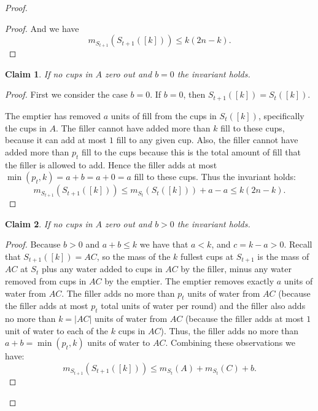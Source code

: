\documentclass[twocolumn]{article}[10pt]
\newtheorem{clm}{Claim}
\begin{document}
\begin{proof}
\begin{proof}
  And we have
  $$m_{S_{t+1}}(S_{t+1}([k])) \le k(2n-k).$$
\end{proof}

\begin{clm}
  If no cups in $A$ zero out and $b=0$ the invariant holds.
\end{clm}
\begin{proof}
First we consider the case $b=0$. If $b=0$, then $S_{t+1}([k]) = S_t([k])$. 

The emptier has removed $a$ units of fill from the cups in $S_t([k])$,
specifically the cups in $A$. The filler cannot have added more than $k$ fill
to these cups, because it can add at most $1$ fill to any given cup. Also, the
filler cannot have added more than $p_t$ fill to the cups because this is the
total amount of fill that the filler is allowed to add. Hence the filler adds
at most $\min(p_t, k) = a+b=a+0=a$ fill to these cups.
Thus the invariant holds:
$$m_{S_{t+1}}(S_{t+1}([k])) \le m_{S_t}(S_t([k]))+a-a \le k(2n-k).$$

\end{proof}

\begin{clm}
  If no cups in $A$ zero out and $b > 0$ the invariant holds.
\end{clm}
\begin{proof}
Because $b>0$ and $a+b \le k$ we have that $a
< k$, and $c = k-a > 0$. Recall that $S_{t+1}([k]) = AC$, so the mass of the
$k$ fullest cups at $S_{t+1}$ is the mass of $AC$ at $S_t$ plus any water added
to cups in $AC$ by the filler, minus any water removed from cups in $AC$ by the
emptier. The emptier removes exactly $a$ units of water from $AC$.
The filler adds no more than $p_t$ units of water from $AC$ (because the filler
adds at most $p_t$ total units of water per round) and the filler also
adds no more than $k = |AC|$ units of water from $AC$ (because the filler adds
at most $1$ unit of water to each of the $k$ cups in $AC$).
Thus, the filler adds no more than $a+b = \min(p_t, k)$ units of water to $AC$.
Combining these observations we have:
$$m_{S_{t+1}}(S_{t+1}([k])) \le m_{S_t}(A) + m_{S_t}(C) + b.$$


\end{proof}
\end{proof}
\end{document}

